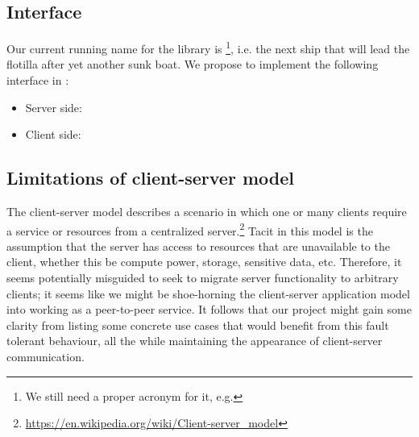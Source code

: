 \subsection{Interface}

Our current running name for the library is \texttt{\APIName}\footnote{We still need a proper acronym for it, e.g. \APIshort}, i.e. the next ship that will lead the flotilla after yet another sunk boat. We propose to implement the following interface in \texttt{\APIName}:

\begin{itemize}
	\item Server side:
    \begin{itemize}
    \end{itemize}
    \item Client side:
    	\begin{itemize}
    	\end{itemize}
\end{itemize}

\subsection{Limitations of client-server model}

The client-server model describes a scenario in which one or many clients require a service or resources from a centralized server.\footnote{\url{https://en.wikipedia.org/wiki/Client-server_model}} Tacit in this model is the assumption that the server has access to resources that are unavailable to the client, whether this be compute power, storage, sensitive data, etc. Therefore, it seems potentially misguided to seek to migrate server functionality to arbitrary clients; it seems like we might be shoe-horning the client-server application model into working as a peer-to-peer service. It follows that our project might gain some clarity from listing some concrete use cases that would benefit from this fault tolerant behaviour, all the while maintaining the appearance of client-server communication. 

